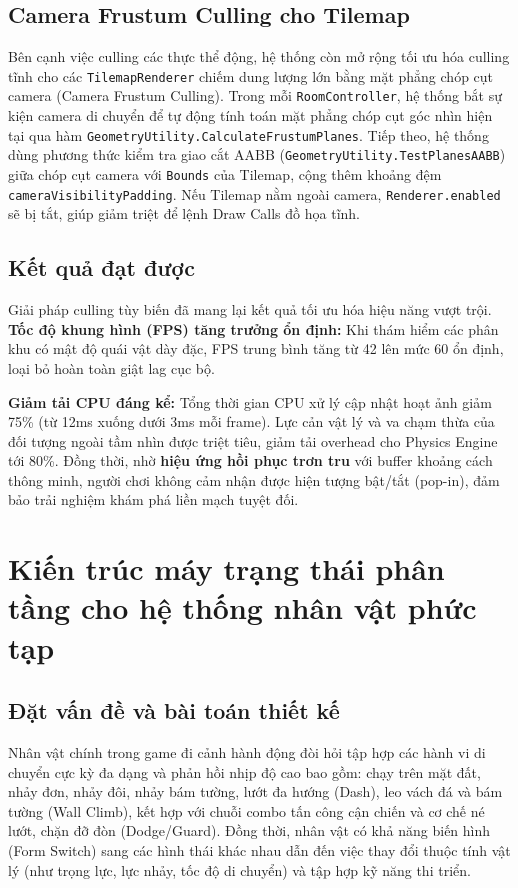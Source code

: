 \subsection{Camera Frustum Culling cho Tilemap}
Bên cạnh việc culling các thực thể động, hệ thống còn mở rộng tối ưu hóa culling tĩnh cho các \texttt{TilemapRenderer} chiếm dung lượng lớn bằng mặt phẳng chóp cụt camera (Camera Frustum Culling).
Trong mỗi \texttt{RoomController}, hệ thống bắt sự kiện camera di chuyển để tự động tính toán mặt phẳng chóp cụt góc nhìn hiện tại qua hàm \texttt{GeometryUtility.}\allowbreak\texttt{CalculateFrustumPlanes}. Tiếp theo, hệ thống dùng phương thức kiểm tra giao cắt AABB (\texttt{GeometryUtility.}\allowbreak\texttt{TestPlanesAABB}) giữa chóp cụt camera với \texttt{Bounds} của Tilemap, cộng thêm khoảng đệm \texttt{cameraVisibilityPadding}. Nếu Tilemap nằm ngoài camera, \texttt{Renderer.enabled} sẽ bị tắt, giúp giảm triệt để lệnh Draw Calls đồ họa tĩnh.

\subsection{Kết quả đạt được}
Giải pháp culling tùy biến đã mang lại kết quả tối ưu hóa hiệu năng vượt trội. \textbf{Tốc độ khung hình (FPS) tăng trưởng ổn định:} Khi thám hiểm các phân khu có mật độ quái vật dày đặc, FPS trung bình tăng từ 42 lên mức 60 ổn định, loại bỏ hoàn toàn giật lag cục bộ. 

\textbf{Giảm tải CPU đáng kể:} Tổng thời gian CPU xử lý cập nhật hoạt ảnh giảm 75\% (từ 12ms xuống dưới 3ms mỗi frame). Lực cản vật lý và va chạm thừa của đối tượng ngoài tầm nhìn được triệt tiêu, giảm tải overhead cho Physics Engine tới 80\%. Đồng thời, nhờ \textbf{hiệu ứng hồi phục trơn tru} với buffer khoảng cách thông minh, người chơi không cảm nhận được hiện tượng bật/tắt (pop-in), đảm bảo trải nghiệm khám phá liền mạch tuyệt đối.

\section{Kiến trúc máy trạng thái phân tầng cho hệ thống nhân vật phức tạp}

\subsection{Đặt vấn đề và bài toán thiết kế}
Nhân vật chính trong game đi cảnh hành động đòi hỏi tập hợp các hành vi di chuyển cực kỳ đa dạng và phản hồi nhịp độ cao bao gồm: chạy trên mặt đất, nhảy đơn, nhảy đôi, nhảy bám tường, lướt đa hướng (Dash), leo vách đá và bám tường (Wall Climb), kết hợp với chuỗi combo tấn công cận chiến và cơ chế né lướt, chặn đỡ đòn (Dodge/Guard). Đồng thời, nhân vật có khả năng biến hình (Form Switch) sang các hình thái khác nhau dẫn đến việc thay đổi thuộc tính vật lý (như trọng lực, lực nhảy, tốc độ di chuyển) và tập hợp kỹ năng thi triển.

